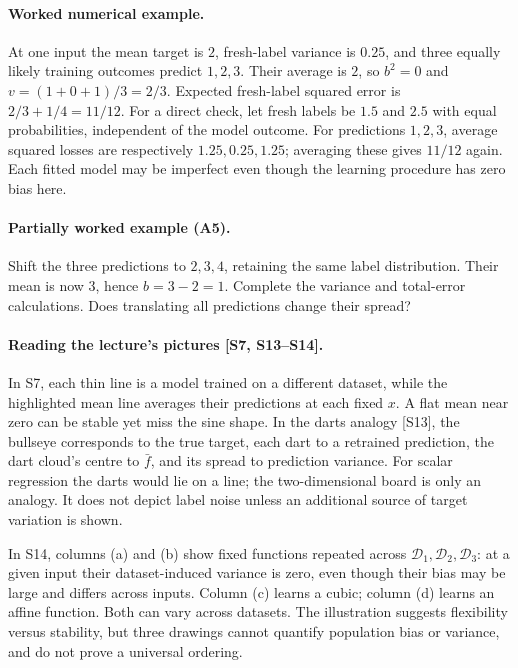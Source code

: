 \paragraph{Worked numerical example.} At one input the mean target is $2$, fresh-label variance is $0.25$, and three equally likely training outcomes predict $1,2,3$. Their average is $2$, so $b^2=0$ and $v=(1+0+1)/3=2/3$. Expected fresh-label squared error is $2/3+1/4=11/12$. For a direct check, let fresh labels be $1.5$ and $2.5$ with equal probabilities, independent of the model outcome. For predictions $1,2,3$, average squared losses are respectively $1.25,0.25,1.25$; averaging these gives $11/12$ again. Each fitted model may be imperfect even though the learning procedure has zero bias here.

\paragraph{Partially worked example (A5).} Shift the three predictions to $2,3,4$, retaining the same label distribution. Their mean is now $3$, hence $b=3-2=1$. Complete the variance and total-error calculations. Does translating all predictions change their spread?

\paragraph{Reading the lecture's pictures [S7, S13--S14].} In S7, each thin line is a model trained on a different dataset, while the highlighted mean line averages their predictions at each fixed $x$. A flat mean near zero can be stable yet miss the sine shape. In the darts analogy [S13], the bullseye corresponds to the true target, each dart to a retrained prediction, the dart cloud's centre to $\bar f$, and its spread to prediction variance. For scalar regression the darts would lie on a line; the two-dimensional board is only an analogy. It does not depict label noise unless an additional source of target variation is shown.

In S14, columns (a) and (b) show fixed functions repeated across $\mathcal D_1,\mathcal D_2,\mathcal D_3$: at a given input their dataset-induced variance is zero, even though their bias may be large and differs across inputs. Column (c) learns a cubic; column (d) learns an affine function. Both can vary across datasets. The illustration suggests flexibility versus stability, but three drawings cannot quantify population bias or variance, and do not prove a universal ordering.

